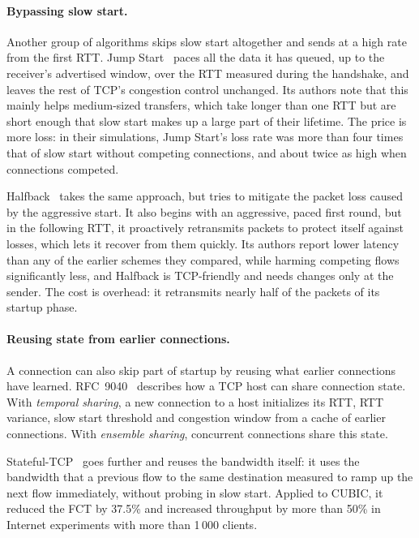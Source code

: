 \paragraph{Bypassing slow start.} Another group of algorithms skips slow start
altogether and sends at a high rate from the first RTT. Jump
Start~\cite{liu2007jumpstart} paces all the data it has queued, up to the receiver's
advertised window, over the RTT measured during the handshake, and leaves the rest of
TCP's congestion control unchanged. Its authors note that this
mainly helps medium-sized transfers, which take longer than one RTT but are short
enough that slow start makes up a large part of their lifetime. The price is more
loss: in their simulations, Jump Start's loss rate was more than four times that of
slow start without competing connections, and about twice as high when connections
competed.

Halfback~\cite{li2015halfback} takes the same approach, but tries to mitigate the packet loss caused by the aggressive start. It also begins with an aggressive, paced first round, but in
the following RTT, it proactively retransmits packets to protect itself against
losses, which lets it recover from them quickly. Its authors
report lower latency than any of the earlier schemes they compared, while harming
competing flows significantly less, and Halfback is TCP-friendly and needs changes
only at the sender. The cost is overhead: it retransmits nearly
half of the packets of its startup phase.



\paragraph{Reusing state from earlier connections.} A connection can also skip part of
startup by reusing what earlier connections have learned. RFC~9040~\cite{rfc9040} describes how a TCP
host can share connection state. With \emph{temporal sharing}, a new
connection to a host initializes its RTT, RTT variance, slow start threshold and
congestion window from a cache of earlier connections. With \emph{ensemble sharing},
concurrent connections share this state.

Stateful-TCP~\cite{guo2020stateful} goes further and reuses the bandwidth itself: it
uses the bandwidth that a previous flow to the same destination measured to ramp up
the next flow immediately, without probing in slow start. Applied to CUBIC, it reduced
the FCT by 37.5\% and increased throughput by more than 50\% in Internet experiments
with more than 1\,000 clients.


